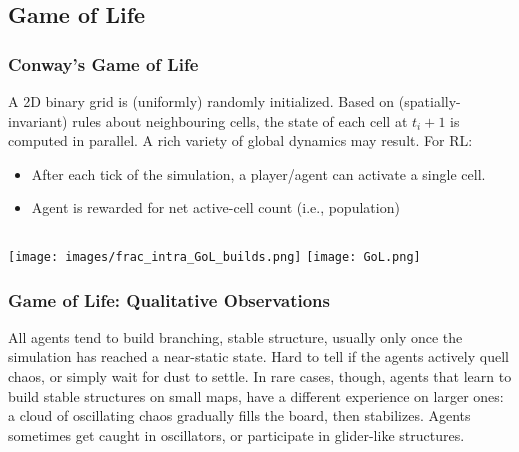 \documentclass[xcolor=dvipsnames]{beamer}
\begin{document}
\subsection{Game of Life}
\begin{frame}
	\frametitle{Conway's Game of Life}
	A 2D binary grid is (uniformly) randomly initialized. Based on (spatially-invariant) rules about neighbouring cells, the state of each cell at $t_i + 1$ is computed in parallel. A rich variety of global dynamics may result.
	For RL:
	\begin{itemize}
		\item After each tick of the simulation, a player/agent can activate a single cell. 
		\item Agent is rewarded for net active-cell count (i.e., population)
	\end{itemize}
    \begin{columns}
        \begin{column}{0.5\linewidth}
        \end{column}
        \begin{column}{0.5\linewidth}
        \end{column}
    \end{columns}
\end{frame}
\begin{frame}
    \texttt{[image: images/frac\_intra\_GoL\_builds.png]}
    \texttt{[image: GoL.png]}
\end{frame}
\begin{frame}
    \frametitle{Game of Life: Qualitative Observations}
    \begin{outline}
        \1 All agents tend to build branching, stable structure, usually only once the simulation has reached a near-static state.
            \2 Hard to tell if the agents actively quell chaos, or simply wait for dust to settle.
            \2 In rare cases, though, agents that learn to build stable structures on small maps, have a different experience on larger ones: a cloud of oscillating chaos gradually fills the board, then stabilizes.
        \1 Agents sometimes get caught in oscillators, or participate in glider-like structures.

    \end{outline}
\end{frame}
\end{document}
